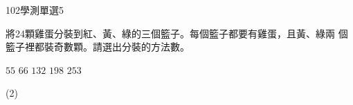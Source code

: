     \begin{QUESTION}
        \begin{ExamInfo}{102}{學測}{單選}{5}
        \end{ExamInfo}
        \begin{ExamAnsRateInfo}{50}{75}{50}{25}
        \end{ExamAnsRateInfo}
        \begin{QBODY}
            將24顆雞蛋分裝到紅、黃、綠的三個籃子。每個籃子都要有雞蛋，且黃、綠兩
			個籃子裡都裝奇數顆。請選出分裝的方法數。
			\begin{QOPS}
					\QOP $55  $
					\QOP $66  $
					\QOP $132 $
					\QOP $198 $
					\QOP $253 $
			\end{QOPS}
        \end{QBODY}
        \begin{QFROMS}
        \end{QFROMS}
        \begin{QTAGS}\end{QTAGS}
        \begin{QANS}
            (2)
        \end{QANS}
        \begin{QSOLLIST}
        \end{QSOLLIST}
        \begin{QEMPTYSPACE}
        \end{QEMPTYSPACE}
    \end{QUESTION}
